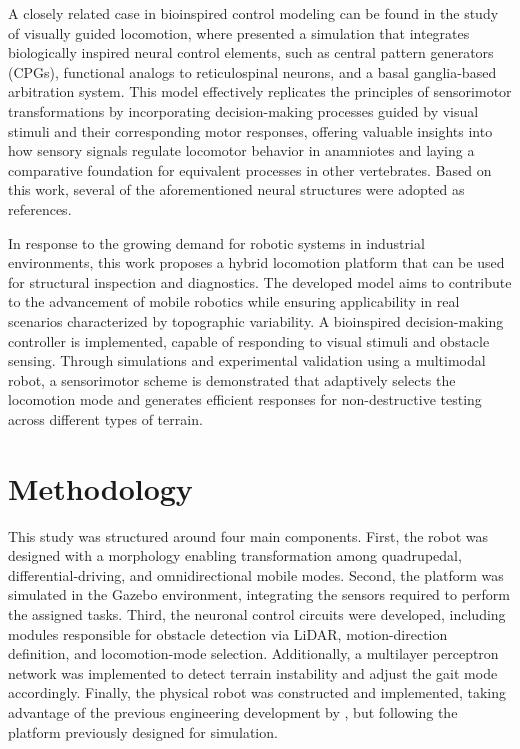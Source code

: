 \documentclass[preprint,12pt]{elsarticle}
\begin{document}
A closely related case in bioinspired control modeling can be found in the study of visually guided locomotion, where \citet{sarvestani2013computational} presented a simulation that integrates biologically inspired neural control elements, such as central pattern generators (CPGs), functional analogs to reticulospinal neurons, and a basal ganglia-based arbitration system. This model effectively replicates the principles of sensorimotor transformations by incorporating decision-making processes guided by visual stimuli and their corresponding motor responses, offering valuable insights into how sensory signals regulate locomotor behavior in anamniotes and laying a comparative foundation for equivalent processes in other vertebrates. Based on this work, several of the aforementioned neural structures were adopted as references. 

In response to the growing demand for robotic systems in industrial environments, this work proposes a hybrid locomotion platform that can be used for structural inspection and diagnostics. The developed model aims to contribute to the advancement of mobile robotics while ensuring applicability in real scenarios characterized by topographic variability. A bioinspired decision-making controller is implemented, capable of responding to visual stimuli and obstacle sensing. Through simulations and experimental validation using a multimodal robot, a sensorimotor scheme is demonstrated that adaptively selects the locomotion mode and generates efficient responses for non-destructive testing across different types of terrain. 

\section{Methodology}

This study was structured around four main components. First, the robot was designed with a morphology enabling transformation among quadrupedal, differential-driving, and omnidirectional mobile modes. Second, the platform was simulated in the Gazebo environment, integrating the sensors required to perform the assigned tasks. Third, the neuronal control circuits were developed, including modules responsible for obstacle detection via LiDAR, motion-direction definition, and locomotion-mode selection. Additionally, a multilayer perceptron network was implemented to detect terrain instability and adjust the gait mode accordingly. Finally, the physical robot was constructed and implemented, taking advantage of the previous engineering development by  \citet{Grajales_Des_2025}, but following the platform previously designed for simulation. 
\end{document}
